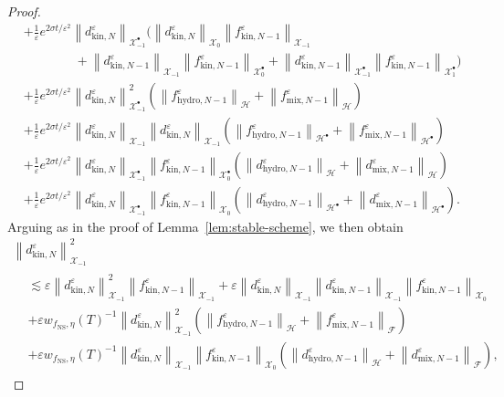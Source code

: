 \documentclass[AHL,Unicode,longabstracts,published]{cedram}
\newcommand{\ns}{\mathrm{NS}}
\newcommand{\hyd}{\mathrm{hydro}}
\newcommand{\mix}{\mathrm{mix}}
\newcommand{\kin}{\mathrm{kin}}
\newcommand{\XX}{\mathcal{X}}
\newcommand{\HH}{\mathcal{H}}
\newcommand{\FFF}{\mathscr{F}}
\newcommand{\HHH}{\mathscr{H}}
\newcommand{\GGG}{\mathscr{X}}
\newcommand{\SSs}{\HH}
\newcommand{\SSsp}{\HH^{\bullet}}
\newcommand{\SSSs}{\HHH}
\newcommand{\SSh}{\bm{\XX}}
\newcommand{\SShp}{\bm{\XX}^{\bullet}}
\newcommand{\SSSh}{\pmb{\GGG}}
\newcommand{\SSSm}{\FFF}
\newcommand*\eps{{\varepsilon}}
\begin{document}
\begin{proof}
\begin{align*}
&+ \frac{1}{\eps} e^{2 \sigma t / \eps^2} \left\| d^\eps_{\kin, N} \right\|_{\SShp_{-1}} \Bigg(\left\| d^\eps_{\kin, N} \right\|_{\SSh_{0}} \left\| f^\eps_{\kin, N-1}\right\|_{\SSh_{-1}} \\
&\phantom{++++} + \left\| d^\eps_{\kin, N-1}\right\|_{\SSh_{-1}} \left\| f^\eps_{\kin, N-1}\right\|_{\SShp_{0}} + \left\| d^\eps_{\kin, N-1}\right\|_{\SShp_{-1}} \left\| f^\eps_{\kin, N-1}\right\|_{\SShp_{1}} \Bigg)\\
& + \frac{1}{\eps} e^{2 \sigma t / \eps^2} \left\| d^\eps_{\kin, N}\right\|_{ \SShp_{-1} }^2 \left(\left\| f^\eps_{\hyd, N-1}\right\|_{ \SSs } + \left\| f^\eps_{\mix, N-1}\right\|_{ \SSs } \right)
\\
& + \frac{1}{\eps} e^{2 \sigma t / \eps^2}\left\| d^\eps_{\kin, N}\right\|_{ \SSh_{-1} }
\left\| d^\eps_{\kin, N}\right\|_{ \SSh_{-1} } \left(\left\| f^\eps_{\hyd, N-1}\right\|_{ \SSsp } + \left\| f^\eps_{\mix, N-1}\right\|_{ \SSsp } \right) \\
& + \frac{1}{\eps} e^{2 \sigma t / \eps^2} \left\| d^\eps_{\kin, N}\right\|_{\SShp_{-1} }\left\| f^\eps_{\kin, N-1}\right\|_{ \SShp_{0} } \left(\left\| d^\eps_{\hyd, N-1}\right\|_{ \SSs } + \left\| d^\eps_{\mix, N-1}\right\|_{ \SSs } \right)
\\
& + \frac{1}{\eps} e^{2 \sigma t / \eps^2}\left\| d^\eps_{\kin, N}\right\|_{ \SShp_{-1} } 
\left\| f^\eps_{\kin, N-1}\right\|_{ \SSh_{0} } \left(\left\| d^\eps_{\hyd, N-1}\right\|_{ \SSsp } + \left\| d^\eps_{\mix, N-1}\right\|_{ \SSsp } \right).
\end{align*}\endgroup
Arguing as in the proof of Lemma~\ref{lem:stable-scheme}, we then obtain
\begin{multline*}
\left\| d^\eps_{\kin, N} \right\|^2_{ \SSSh_{-1} }
\\
\begin{aligned}
&\lesssim \eps \left\| d^\eps_{\kin, N} \right\|_{\SSSh_{-1}}^2 \left\| f^\eps_{\kin, N-1} \right\|_{\SSSh_{-1} } + \eps \left\| d^\eps_{\kin, N} \right\|_{\SSSh_{-1}} \left\| d^\eps_{\kin, N-1} \right\|_{\SSSh_{-1}} \left\| f^\eps_{\kin, N-1} \right\|_{ \SSSh_{0} } \\
& + \eps w_{ f_\ns, \eta }(T)^{-1} \left\| d^\eps_{\kin, N} \right\|_{\SSSh_{-1}}^2 \left(\left\| f^\eps_{\hyd, N-1} \right\|_\SSSs + \left\| f^\eps_{\mix, N-1} \right\|_\SSSm \right) \\
& + \eps w_{ f_\ns, \eta }(T)^{-1} \left\| d^\eps_{\kin, N} \right\|_{\SSSh_{-1}} \left\| f^\eps_{\kin, N-1} \right\|_{\SSSh_{0}} \left(\left\| d^\eps_{\hyd, N-1} \right\|_\SSSs + \left\| d^\eps_{\mix, N-1} \right\|_\SSSm \right),

\end{aligned}
\end{multline*}
\end{proof}
\end{document}
